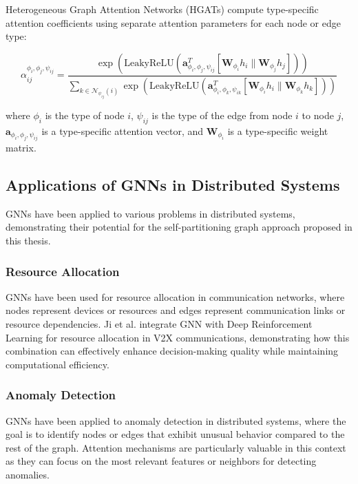 \documentclass{article}
\begin{document}
Heterogeneous Graph Attention Networks (HGATs) \cite{wang2019heterogeneous} compute type-specific attention coefficients using separate attention parameters for each node or edge type:

\begin{equation}
\alpha_{ij}^{\phi_i, \phi_j, \psi_{ij}} = \frac{\exp\left(\text{LeakyReLU}\left(\mathbf{a}_{\phi_i, \phi_j, \psi_{ij}}^T[\mathbf{W}_{\phi_i} h_i \| \mathbf{W}_{\phi_j} h_j]\right)\right)}{\sum_{k \in \mathcal{N}_{\psi_{ij}}(i)} \exp\left(\text{LeakyReLU}\left(\mathbf{a}_{\phi_i, \phi_k, \psi_{ik}}^T[\mathbf{W}_{\phi_i} h_i \| \mathbf{W}_{\phi_k} h_k]\right)\right)}
\end{equation}

where $\phi_i$ is the type of node $i$, $\psi_{ij}$ is the type of the edge from node $i$ to node $j$, $\mathbf{a}_{\phi_i, \phi_j, \psi_{ij}}$ is a type-specific attention vector, and $\mathbf{W}_{\phi_i}$ is a type-specific weight matrix.

\subsection{Applications of GNNs in Distributed Systems}

GNNs have been applied to various problems in distributed systems, demonstrating their potential for the self-partitioning graph approach proposed in this thesis.

\subsubsection{Resource Allocation}

GNNs have been used for resource allocation in communication networks, where nodes represent devices or resources and edges represent communication links or resource dependencies. Ji et al. \cite{ji2024graph} integrate GNN with Deep Reinforcement Learning for resource allocation in V2X communications, demonstrating how this combination can effectively enhance decision-making quality while maintaining computational efficiency.

\subsubsection{Anomaly Detection}

GNNs have been applied to anomaly detection in distributed systems, where the goal is to identify nodes or edges that exhibit unusual behavior compared to the rest of the graph. Attention mechanisms are particularly valuable in this context as they can focus on the most relevant features or neighbors for detecting anomalies.
\end{document}

